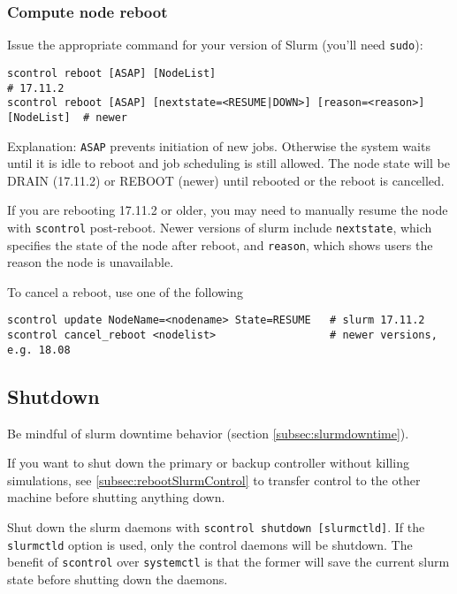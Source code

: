 \subsubsection{Compute node reboot} \label{subsec:rebootSlurmCompute}

Issue the appropriate command for your version of Slurm (you'll need \texttt{sudo}):

\begin{verbatim}
scontrol reboot [ASAP] [NodeList]                                              # 17.11.2
scontrol reboot [ASAP] [nextstate=<RESUME|DOWN>] [reason=<reason>] [NodeList]  # newer
\end{verbatim}

Explanation: \texttt{ASAP} prevents initiation of new jobs. Otherwise the system waits until it is idle to reboot and job scheduling is still allowed. The node state will be DRAIN (17.11.2) or REBOOT (newer) until rebooted or the reboot is cancelled. 

If you are rebooting 17.11.2 or older, you may need to manually resume the node with \texttt{scontrol} post-reboot. Newer versions of slurm include \texttt{nextstate}, which specifies the state of the node after reboot, and \texttt{reason}, which shows users the reason the node is unavailable.

To cancel a reboot, use one of the following

\begin{verbatim}
scontrol update NodeName=<nodename> State=RESUME   # slurm 17.11.2
scontrol cancel_reboot <nodelist>                  # newer versions, e.g. 18.08
\end{verbatim}

\subsection{Shutdown} \label{subsec:slurmshutdown}

Be mindful of slurm downtime behavior (section \ref{subsec:slurmdowntime}).

If you want to shut down the primary or backup controller without killing simulations, see \ref{subsec:rebootSlurmControl} to transfer control to the other machine before shutting anything down.

Shut down the slurm daemons with \texttt{scontrol shutdown [slurmctld]}. If the \texttt{slurmctld} option is used, only the control daemons will be shutdown. The benefit of \texttt{scontrol} over \texttt{systemctl} is that the former will save the current slurm state before shutting down the daemons.

